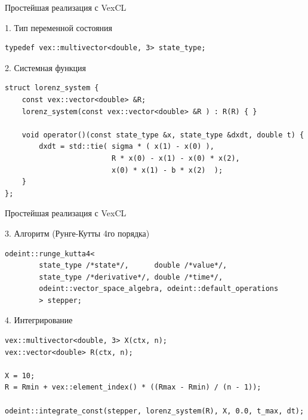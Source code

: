 \documentclass[@BEAMER_OPTIONS@]{beamer}
\begin{document}
\begin{frame}[fragile]{Простейшая реализация с VexCL}
    \begin{exampleblock}{1. Тип переменной состояния}
        \begin{lstlisting}
typedef vex::multivector<double, 3> state_type;
        \end{lstlisting}
    \end{exampleblock}

    \begin{exampleblock}{2. Системная функция}
        \begin{lstlisting}[firstnumber=last]
struct lorenz_system {
    const vex::vector<double> &R;
    lorenz_system(const vex::vector<double> &R ) : R(R) { }

    void operator()(const state_type &x, state_type &dxdt, double t) {
        dxdt = std::tie( sigma * ( x(1) - x(0) ),
                         R * x(0) - x(1) - x(0) * x(2),
                         x(0) * x(1) - b * x(2)  );
    }
};
        \end{lstlisting}
    \end{exampleblock}
\end{frame}


\begin{frame}[fragile]{Простейшая реализация с VexCL}
    \begin{exampleblock}{3. Алгоритм (Рунге-Кутты 4го порядка)}
        \begin{lstlisting}[firstnumber=last]
odeint::runge_kutta4<
        state_type /*state*/,      double /*value*/,
        state_type /*derivative*/, double /*time*/,
        odeint::vector_space_algebra, odeint::default_operations
        > stepper;
        \end{lstlisting}
    \end{exampleblock}
    \begin{exampleblock}{4. Интегрирование}
        \begin{lstlisting}[firstnumber=last]
vex::multivector<double, 3> X(ctx, n);
vex::vector<double> R(ctx, n);

X = 10;
R = Rmin + vex::element_index() * ((Rmax - Rmin) / (n - 1));

odeint::integrate_const(stepper, lorenz_system(R), X, 0.0, t_max, dt);
        \end{lstlisting}
    \end{exampleblock}
\end{frame}
\end{document}
